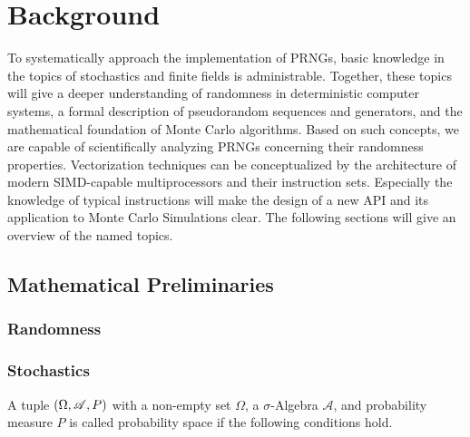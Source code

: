 \documentclass{stdlocal}
\begin{document}
\section{Background} %
\label{sec:background}
  To systematically approach the implementation of PRNGs, basic knowledge in the topics of stochastics and finite fields is administrable.
  Together, these topics will give a deeper understanding of randomness in deterministic computer systems, a formal description of pseudorandom sequences and generators, and the mathematical foundation of Monte Carlo algorithms.
  Based on such concepts, we are capable of scientifically analyzing PRNGs concerning their randomness properties.
  Vectorization techniques can be conceptualized by the architecture of modern SIMD-capable multiprocessors and their instruction sets.
  Especially the knowledge of typical instructions will make the design of a new API and its application to Monte Carlo Simulations clear.
  The following sections will give an overview of the named topics.

  \subsection{Mathematical Preliminaries} %
  \label{sub:mathematical_preliminaries}
    \subsubsection*{Randomness} %
    \label{ssub:randomness}


    \subsubsection*{Stochastics} %
    \label{ssub:stochastics}
      \begin{definition}
        A tuple $\left( \Omega, \mathscr{A}, P \right)$ with a non-empty set $\Omega$, a $σ$-Algebra $\mathscr{A}$, and probability measure $P$ is called probability space if the following conditions hold.
      \end{definition}

      \begin{definition}

      \end{definition}

      \begin{definition}[Independence]

      \end{definition}
\end{document}
